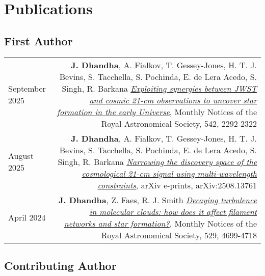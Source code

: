 \documentclass{article}
\begin{document}

\section*{Publications}

\subsection*{First Author}

\begin{longtable}{L!{\vrule}R}
    September 2025 &
    \textbf{J. Dhandha}, A. Fialkov, T. Gessey-Jones, H. T. J. Bevins, S. Tacchella, S. Pochinda, E. de Lera Acedo, S. Singh, R. Barkana
    \href{https://ui.adsabs.harvard.edu/abs/2025MNRAS.542.2292D}{\textit{Exploiting synergies between JWST and cosmic 21-cm observations to uncover star formation in the early Universe}},
    Monthly Notices of the Royal Astronomical Society, 542, 2292-2322 \\

    August 2025 &
    \textbf{J. Dhandha}, A. Fialkov, T. Gessey-Jones, H. T. J. Bevins, S. Tacchella, S. Pochinda, E. de Lera Acedo, S. Singh, R. Barkana
    \href{https://ui.adsabs.harvard.edu/abs/2025arXiv250813761D}{\textit{Narrowing the discovery space of the cosmological 21-cm signal using multi-wavelength constraints}},
    arXiv e-prints, arXiv:2508.13761 \\

    April 2024 &
    \textbf{J. Dhandha}, Z. Faes, R. J. Smith
    \href{https://ui.adsabs.harvard.edu/abs/2024MNRAS.529.4699D}{\textit{Decaying turbulence in molecular clouds: how does it affect filament networks and star formation?}},
    Monthly Notices of the Royal Astronomical Society, 529, 4699-4718 \\
\end{longtable}

\subsection*{Contributing Author}
\end{document}
